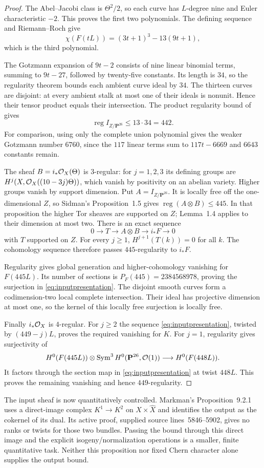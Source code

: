 \begin{proof}
The Abel--Jacobi class is $\Theta^2/2$, so each curve has $L$-degree nine and Euler characteristic $-2$. This proves the first two polynomials. The defining sequence and Riemann--Roch give
\[
 \chi(F(tL))=(3t+1)^3-13(9t+1),
\]
which is the third polynomial.

The Gotzmann expansion of $9t-2$ consists of nine linear binomial terms, summing to $9t-27$, followed by twenty-five constants. Its length is $34$, so the regularity theorem bounds each ambient curve ideal by $34$. The thirteen curves are disjoint: at every ambient stalk at most one of their ideals is nonunit. Hence their tensor product equals their intersection. The product regularity bound of \citet[Proposition~1.5 and Corollary~1.6]{Sidman01} gives
\[
 \operatorname{reg}I_{Z/\mathbf P^{26}}\le13\cdot34=442.
\]
For comparison, using only the complete union polynomial gives the weaker Gotzmann number $6760$, since the $117$ linear terms sum to $117t-6669$ and $6643$ constants remain.

The sheaf $B=i_*\mathcal O_X(\Theta)$ is $3$-regular: for $j=1,2,3$ its defining groups are $H^j(X,\mathcal O_X((10-3j)\Theta))$, which vanish by positivity on an abelian variety. Higher groups vanish by support dimension. Put $A=I_{Z/\mathbf P^{26}}$. It is locally free off the one-dimensional $Z$, so Sidman's Proposition~1.5 gives $\operatorname{reg}(A\otimes B)\le445$. In that proposition the higher Tor sheaves are supported on $Z$; Lemma~1.4 applies to their dimension at most two. There is an exact sequence
\[
 0\longrightarrow T\longrightarrow A\otimes B\longrightarrow i_*F\longrightarrow0
\]
with $T$ supported on $Z$. For every $j\ge1$, $H^{j+1}(T(k))=0$ for all $k$. The cohomology sequence therefore passes $445$-regularity to $i_*F$.

Regularity gives global generation and higher-cohomology vanishing for $F(445L)$. Its number of sections is $P_F(445)=2384568978$, proving the surjection in \eqref{eq:inputpresentation}. The disjoint smooth curves form a codimension-two local complete intersection. Their ideal has projective dimension at most one, so the kernel of this locally free surjection is locally free.

Finally $i_*\mathcal O_X$ is $4$-regular. For $j\ge2$ the sequence \eqref{eq:inputpresentation}, twisted by $(449-j)L$, proves the required vanishing for $K$. For $j=1$, regularity gives surjectivity of
\[
 H^0(F(445L))\otimes\operatorname{Sym}^3H^0(\mathbf P^{26},\mathcal O(1))
 \longrightarrow H^0(F(448L)).
\]
It factors through the section map in \eqref{eq:inputpresentation} at twist $448L$. This proves the remaining vanishing and hence $449$-regularity.
\end{proof}

The input sheaf is now quantitatively controlled. Markman's Proposition~9.2.1 uses a direct-image complex $K^1\to K^2$ on $X\times\widehat X$ and identifies the output as the cokernel of its dual. Its active proof, supplied source lines~5846--5902, gives no ranks or twists for those two bundles. Passing the bound through this direct image and the explicit isogeny/normalization operations is a smaller, finite quantitative task. Neither this proposition nor fixed Chern character alone supplies the output bound.
